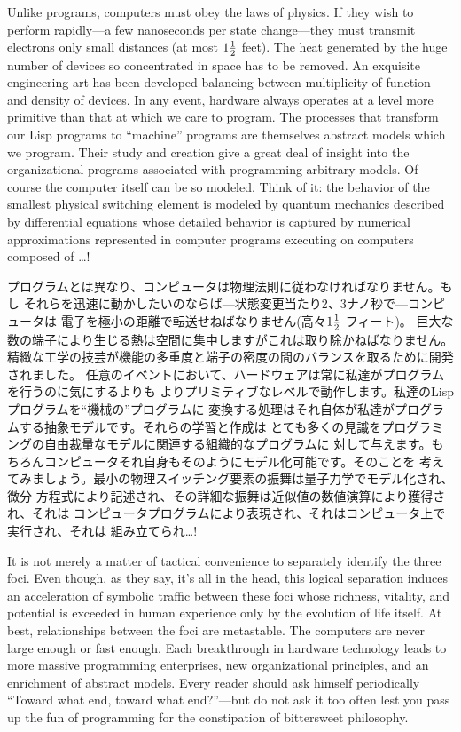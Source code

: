 \documentclass[oneside]{book}
\begin{document}
Unlike programs, computers must obey the laws of physics.  If they wish to
perform rapidly---a few nanoseconds per state change---they must transmit
electrons only small distances (at most $1 {1\over2}$ feet). The heat generated by
the huge number of devices so concentrated in space has to be removed.  An
exquisite engineering art has been developed balancing between multiplicity of
function and density of devices.  In any event, hardware always operates at a
level more primitive than that at which we care to program.  The processes that
transform our Lisp programs to ``machine'' programs are themselves abstract
models which we program.  Their study and creation give a great deal of insight
into the organizational programs associated with programming arbitrary models.
Of course the computer itself can be so modeled.  Think of it: the behavior of
the smallest physical switching element is modeled by quantum mechanics
described by differential equations whose detailed behavior is captured by
numerical approximations represented in computer programs executing on
computers composed of \dots !

プログラムとは異なり、コンピュータは物理法則に従わなければなりません。もし
それらを迅速に動かしたいのならば---状態変更当たり2、3ナノ秒で---コンピュータは
電子を極小の距離で転送せねばなりません(高々$1{1\over2}$ フィート)。
巨大な数の端子により生じる熱は空間に集中しますがこれは取り除かねばなりません。
精緻な工学の技芸が機能の多重度と端子の密度の間のバランスを取るために開発されました。
任意のイベントにおいて、ハードウェアは常に私達がプログラムを行うのに気にするよりも
よりプリミティブなレベルで動作します。私達のLispプログラムを``機械の''プログラムに
変換する処理はそれ自体が私達がプログラムする抽象モデルです。それらの学習と作成は
とても多くの見識をプログラミングの自由裁量なモデルに関連する組織的なプログラムに
対して与えます。もちろんコンピュータそれ自身もそのようにモデル化可能です。そのことを
考えてみましょう。最小の物理スイッチング要素の振舞は量子力学でモデル化され、微分
方程式により記述され、その詳細な振舞は近似値の数値演算により獲得され、それは
コンピュータプログラムにより表現され、それはコンピュータ上で実行され、それは
組み立てられ\dots !

It is not merely a matter of tactical convenience to separately identify the
three foci.  Even though, as they say, it's all in the head, this logical
separation induces an acceleration of symbolic traffic between these foci whose
richness, vitality, and potential is exceeded in human experience only by the
evolution of life itself.  At best, relationships between the foci are
metastable.  The computers are never large enough or fast enough.  Each
breakthrough in hardware technology leads to more massive programming
enterprises, new organizational principles, and an enrichment of abstract
models.  Every reader should ask himself periodically ``Toward what end, toward
what end?''---but do not ask it too often lest you pass up the fun of
programming for the constipation of bittersweet philosophy.
\end{document}
